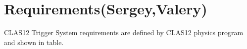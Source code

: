 \section{Requirements(Sergey,Valery)}

CLAS12 Trigger System requirements are defined by CLAS12 physics program and shown in table. 

